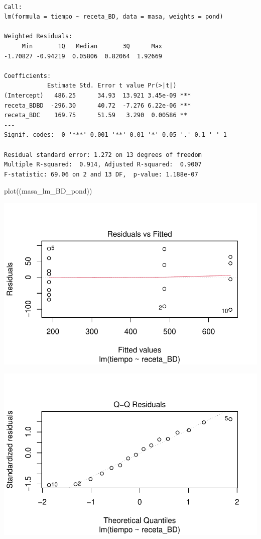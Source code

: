 \documentclass[
  letterpaper,
  DIV=11,
  numbers=noendperiod]{scrartcl}
\newenvironment{Shaded}{\begin{snugshade}}{\end{snugshade}}
\newcommand{\FunctionTok}[1]{\textcolor[rgb]{0.28,0.35,0.67}{#1}}
\newcommand{\NormalTok}[1]{\textcolor[rgb]{0.00,0.23,0.31}{#1}}
\begin{document}
\begin{verbatim}

Call:
lm(formula = tiempo ~ receta_BD, data = masa, weights = pond)

Weighted Residuals:
     Min       1Q   Median       3Q      Max 
-1.70827 -0.94219  0.05806  0.82064  1.92669 

Coefficients:
            Estimate Std. Error t value Pr(>|t|)    
(Intercept)   486.25      34.93  13.921 3.45e-09 ***
receta_BDBD  -296.30      40.72  -7.276 6.22e-06 ***
receta_BDC    169.75      51.59   3.290  0.00586 ** 
---
Signif. codes:  0 '***' 0.001 '**' 0.01 '*' 0.05 '.' 0.1 ' ' 1

Residual standard error: 1.272 on 13 degrees of freedom
Multiple R-squared:  0.914, Adjusted R-squared:  0.9007 
F-statistic: 69.06 on 2 and 13 DF,  p-value: 1.188e-07
\end{verbatim}

\begin{Shaded}
\begin{Highlighting}[]
\FunctionTok{plot}\NormalTok{((masa\_lm\_BD\_pond))}
\end{Highlighting}
\end{Shaded}

\includegraphics{solucion-masa-pizza_files/figure-pdf/modPond-combo-1.pdf}

\includegraphics{solucion-masa-pizza_files/figure-pdf/modPond-combo-2.pdf}
\end{document}
